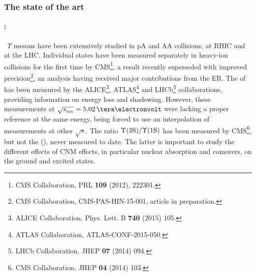 \documentclass[a4paper,11pt]{article}
\newcommand{\ER}{ER\xspace}
\begin{document}






\subsubsection{The state of the art} \label{sec:stateoftheart}

\paragraph{\PgUabc:\ }\ 
$\Upsilon$ mesons have been extensively studied in pA and AA collisions, at RHIC and at the LHC. Individual
\PgUabc states have been measured separately in heavy-ion collisions for the first time by CMS\footnote{CMS Collaboration, PRL {\bf 109} (2012), 222301.},
a result recently superseded with improved precision\footnote{CMS Collaboration, CMS-PAS-HIN-15-001, article in preparation.}, an analysis having received major contributions from the \ER. The \rpa of \PgUa has been measured by the ALICE\footnote{ALICE Collaboration, Phys. Lett. B {\bf 740} (2015) 105.}, ATLAS\footnote{ATLAS Collaboration, ATLAS-CONF-2015-050.} and LHCb\footnote{\label{LHCbupsi}LHCb Collaboration, JHEP {\bf 07} (2014) 094.} collaborations, providing information on energy loss and shadowing. However,
these measurements at $\sqrtsnn = 5.02\,\TeV$ were lacking a proper \pp reference at the same energy, being forced to use an interpolation of measurements at other
$\sqrt{s}$. The ratio $\Upsilon\text{(3S)}/\Upsilon\text{(1S)}$ has been measured by CMS\footnote{CMS Collaboration, JHEP {\bf 04} (2014) 103.}, but not the \rpa (\PgUc), never measured to date. The latter is important to study the different effects of CNM effects, in particular nuclear absorption and comovers, on the ground and excited states.
\end{document}
